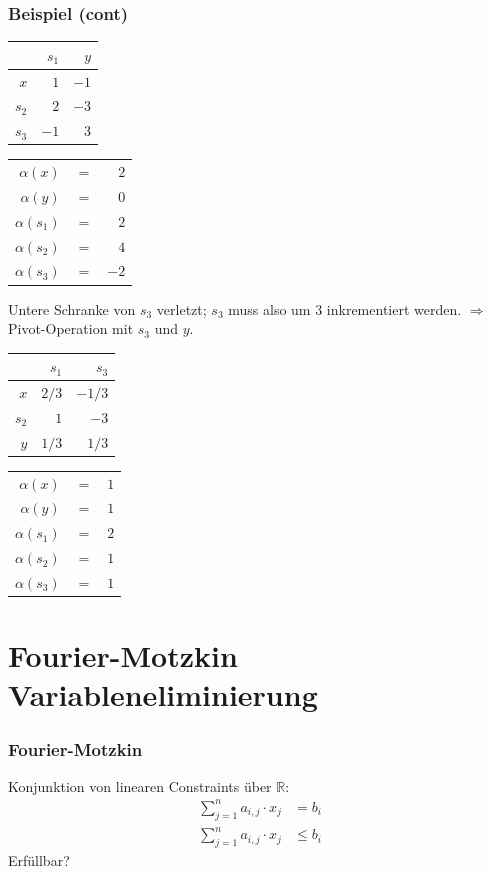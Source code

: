 \documentclass[hyperref={pdfpagelabels=false}]{beamer}
\begin{document}
\begin{frame}
	\frametitle{Beispiel (cont)}
	\begin{center}
		\begin{tabular}{r|rr}
			& $s_1$ & $y$ \\ \hline
			$x$ & $1$ & $-1$ \\
			$s_2$ & $2$ & $-3$ \\
			$s_3$ & $-1$ & $3$
		\end{tabular}
		\qquad
		\begin{tabular}{rrr}
			$\alpha(x)$ & $=$ & $2$ \\
			$\alpha(y)$ & $=$ & $0$ \\
			$\alpha(s_1)$ & $=$ & $2$ \\
			$\alpha(s_2)$ & $=$ & $4$ \\
			$\alpha(s_3)$ & $=$ & $-2$
		\end{tabular}
	\end{center}
	Untere Schranke von $s_3$ verletzt; $s_3$ muss also um $3$ inkrementiert werden. $\Rightarrow$ Pivot-Operation mit $s_3$ und $y$.
	\begin{center}
		\begin{tabular}{r|rr}
			& $s_1$ & $s_3$ \\ \hline
			$x$ & $2/3$ & $-1/3$ \\
			$s_2$ & $1$ & $-3$ \\
			$y$ & $1/3$ & $1/3$
		\end{tabular}
		\qquad
		\begin{tabular}{rrr}
			$\alpha(x)$ & $=$ & $1$ \\
			$\alpha(y)$ & $=$ & $1$ \\
			$\alpha(s_1)$ & $=$ & $2$ \\
			$\alpha(s_2)$ & $=$ & $1$ \\
			$\alpha(s_3)$ & $=$ & $1$
		\end{tabular}
	\end{center}
\end{frame}
\section{Fourier-Motzkin Variableneliminierung}
\begin{frame}
	\frametitle{Fourier-Motzkin}
	Konjunktion von linearen Constraints über $\mathds{R}$:
	\begin{align*}
		\sum_{j=1}^n a_{i,j} \cdot x_j &= b_i \\
		\sum_{j=1}^n a_{i,j} \cdot x_j &\leq b_i
	\end{align*}
	Erfüllbar?
\end{frame}
\end{document}
